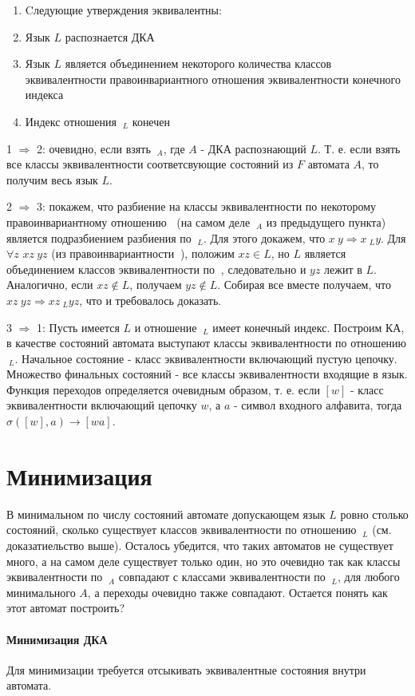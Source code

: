 \begin{Proof}
\begin{enumerate}
\item Cледующие утверждения эквивалентны:

\item Язык $L$ распознается ДКА

\item Язык $L$ является объединением некоторого количества классов эквивалентности правоинвариантного отношения эквивалентности конечного индекса

\item Индекс отношения $~_L$ конечен
\end{enumerate}
1 $\Rightarrow$ 2: очевидно, если взять $~_A$, где $A$ - ДКА распознающий $L$. Т. е. если взять все классы эквивалентности соответсвующие состояний из $F$
автомата $A$, то получим весь язык $L$.

2 $\Rightarrow$ 3: покажем, что разбиение на классы эквивалентности по некоторому правоинвариантному отношению $~$ (на самом деле $~_A$ из предыдущего пункта)
является подразбиением разбиения по $~_L$. Для этого докажем, что $x~y \Rightarrow x~_Ly$. Для $\forall z$ $xz~yz$ (из правоинвариантности $~$), положим $xz \in L$,
но $L$ является объединением классов эквивалентности по $~$, следовательно и $yz$ лежит в $L$. Аналогично, если $xz \not\in L$, получаем $yz \not\in L$. Собирая все
вместе получаем, что $xz~yz \Rightarrow xz~_Lyz$, что и требовалось доказать.

3 $\Rightarrow$ 1: Пусть имеется $L$ и отношение $~_L$ имеет конечный индекс. Построим КА, в качестве состояний автомата выступают классы эквивалентности по
отношению $~_L$. Начальное состояние - класс эквивалентности включающий пустую цепочку. Множество финальных состояний - все классы эквивалентности входящие в язык.
Функция переходов определяется очевидным образом, т. е. если $[w]$ - класс эквивалентности включающий цепочку $w$, а $a$ - символ входного алфавита, тогда
$\sigma\left([w],a\right) \rightarrow [wa]$.
\end{Proof}

\section{Минимизация}

В минимальном по числу состояний автомате допускающем язык $L$ ровно столько состояний, сколько существует классов эквивалентности по отношению $~_L$
(см. доказатиельство выше). Осталось убедится, что таких автоматов не существует много, а на самом деле существует только один, но это очевидно так как
классы эквивалентности по $~_A$ совпадают с классами эквивалентности по $~_L$, для любого минимального $A$, а переходы очевидно также совпадают. Остается
понять как этот автомат построить?

\paragraph{Минимизация ДКА} Для минимизации требуется отсыкивать эквивалентные состояния внутри автомата.

